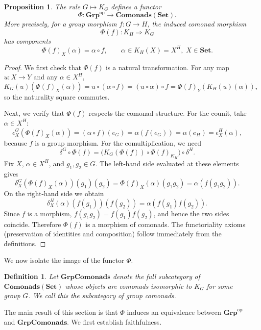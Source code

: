 \documentclass{amsart}
\newtheorem{proposition}{Proposition}
\newtheorem{definition}{Definition}
\begin{document}
\begin{proposition}\label{prop:functoriality_comonad}
The rule $G \mapsto K_G$ defines a functor
\[
\Phi \colon \mathbf{Grp}^{\mathrm{op}} \longrightarrow \mathbf{Comonads}(\mathbf{Set}).
\]
More precisely, for a group morphism $f \colon G \longrightarrow H$, the induced comonad morphism
\[
\Phi(f) \colon K_H \Longrightarrow K_G
\]
has components
\[
\Phi(f)_X(\alpha) = \alpha \circ f,
\qquad 
\alpha \in K_H(X) = X^H,\; X \in \mathbf{Set}.
\]
\end{proposition}

\begin{proof}
We first check that $\Phi(f)$ is a natural transformation. For any map $u \colon X \rightarrow Y$ and any $\alpha \in X^H$,
\[
K_G(u)(\Phi(f)_X(\alpha)) = u \circ (\alpha \circ f) = (u \circ \alpha) \circ f = \Phi(f)_Y(K_H(u)(\alpha)),
\]
so the naturality square commutes.

Next, we verify that $\Phi(f)$ respects the comonad structure. 
For the counit, take $\alpha \in X^H$:
\[
\epsilon^G_X(\Phi(f)_X(\alpha)) = (\alpha \circ f)(e_G) = \alpha(f(e_G)) = \alpha(e_H) = \epsilon^H_X(\alpha),
\]
because $f$ is a group morphism. For the comultiplication, we need
\[
\delta^G \circ \Phi(f) = \bigl( K_G(\Phi(f)) \circ \Phi(f)_{K_H} \bigr) \circ \delta^H.
\]
Fix $X$, $\alpha \in X^H$, and $g_1,g_2 \in G$. 
The left-hand side evaluated at these elements gives
\[
\delta^G_X(\Phi(f)_X(\alpha))(g_1)(g_2) = \Phi(f)_X(\alpha)(g_1 g_2) = \alpha(f(g_1 g_2)).
\]
On the right-hand side we obtain
\[
\delta^H_X(\alpha)(f(g_1))(f(g_2)) = \alpha(f(g_1) f(g_2)).
\]
Since $f$ is a morphism, $f(g_1 g_2) = f(g_1)f(g_2)$, and hence the two sides coincide. Therefore $\Phi(f)$ is a morphism of comonads. The functoriality axioms (preservation of identities and composition) follow immediately from the definitions.
\end{proof}

 

We now isolate the image of the functor $\Phi$.

\begin{definition}
Let $\mathbf{GrpComonads}$ denote the full subcategory of $\mathbf{Comonads}(\mathbf{Set})$ whose objects are comonads isomorphic to $K_G$ for some group $G$. We call this the \emph{subcategory of group comonads}.
\end{definition}

The main result of this section is that $\Phi$ induces an equivalence between $\mathbf{Grp}^{\mathrm{op}}$ and $\mathbf{GrpComonads}$. We first establish faithfulness.
\end{document}
